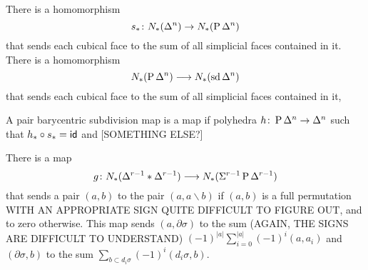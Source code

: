 There is a homomorphism
\[s_*\colon N_*(\Delta^n)\to N_*(\operatorname{P} \Delta^n)\]
that sends each cubical face to the sum of all simplicial faces contained in it. There is a homomorphism
\[N_*(\operatorname{P} \Delta^n)\longrightarrow N_*(\operatorname{sd} \Delta^n)\]
that sends each cubical face to the sum of all simplicial faces contained in it,
\begin{definition}
    A pair barycentric subdivision map is a map if polyhedra $h\colon \operatorname{P} \Delta^n\to \Delta^n$ such that $h_*\circ s_* = \mathsf{id}$ and [SOMETHING ELSE?]
\end{definition}
There is a map
\[g\colon N_*(\Delta^{r-1}*\Delta^{r-1})\longrightarrow N_*(\Sigma^{r-1}\operatorname{P} \Delta^{r-1})\]
that sends a pair $(a,b)$ to the pair $(a,a\smallsetminus b)$ if $(a,b)$ is a full permutation WITH AN APPROPRIATE SIGN QUITE DIFFICULT TO FIGURE OUT, and to zero otherwise. This map sends $(a,\partial \sigma)$ to the sum (AGAIN, THE SIGNS ARE DIFFICULT TO UNDERSTAND) $(-1)^{|a|}\sum_{i=0}^{|a|}(-1)^i (a,a_i)$ and $(\partial \sigma, b)$ to the sum $\sum_{b\subset d_i\sigma}(-1)^i(d_i\sigma,b)$.

